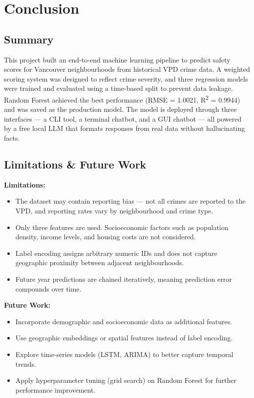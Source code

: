 \documentclass{article}
\begin{document}
\section{Conclusion}

\subsection{Summary}
This project built an end-to-end machine learning pipeline to predict safety scores
for Vancouver neighbourhoods from historical VPD crime data. A weighted scoring
system was designed to reflect crime severity, and three regression models were
trained and evaluated using a time-based split to prevent data leakage. Random
Forest achieved the best performance (RMSE = 1.0021, R\textsuperscript{2} = 0.9944)
and was saved as the production model. The model is deployed through three
interfaces --- a CLI tool, a terminal chatbot, and a GUI chatbot --- all powered by
a free local LLM that formats responses from real data without hallucinating facts.

\subsection{Limitations \& Future Work}
\textbf{Limitations:}
\begin{itemize}[leftmargin=*]
  \item The dataset may contain reporting bias --- not all crimes are reported to
        the VPD, and reporting rates vary by neighbourhood and crime type.
  \item Only three features are used. Socioeconomic factors such as population
        density, income levels, and housing costs are not considered.
  \item Label encoding assigns arbitrary numeric IDs and does not capture
        geographic proximity between adjacent neighbourhoods.
  \item Future year predictions are chained iteratively, meaning prediction error
        compounds over time.
\end{itemize}

\textbf{Future Work:}
\begin{itemize}[leftmargin=*]
  \item Incorporate demographic and socioeconomic data as additional features.
  \item Use geographic embeddings or spatial features instead of label encoding.
  \item Explore time-series models (LSTM, ARIMA) to better capture temporal trends.
  \item Apply hyperparameter tuning (grid search) on Random Forest for further
        performance improvement.
\end{itemize}
\end{document}
